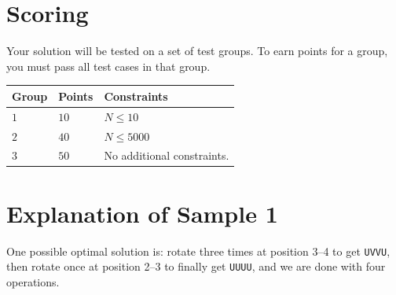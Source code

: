 \section*{Scoring}
Your solution will be tested on a set of test groups.
To earn points for a group, you must pass all test cases in that group.

\noindent
\begin{tabular}{| l | l | l |}
  \hline
  \textbf{Group} & \textbf{Points} & \textbf{Constraints} \\ \hline
  $1$   & $10$       & $N \leq 10$ \\ \hline
  $2$   & $40$       & $N \leq 5000$ \\ \hline
  $3$   & $50$       & No additional constraints. \\ \hline
\end{tabular}

\section*{Explanation of Sample 1}
One possible optimal solution is: rotate three times at position 3--4 to get \texttt{UVVU}, then rotate
once at position 2--3 to finally get \texttt{UUUU}, and we are done with four operations.
